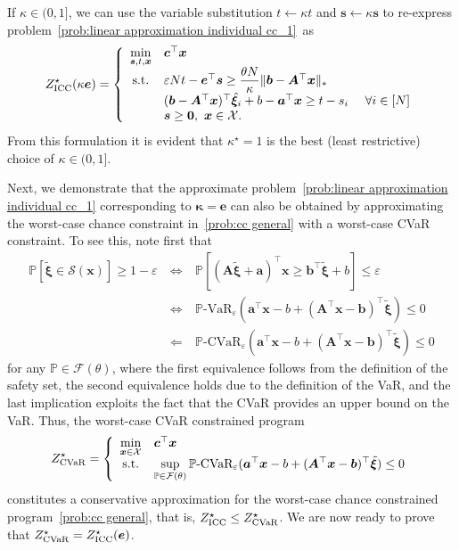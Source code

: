 \documentclass[nonblindrev]{informs2017}
\newcommand{\bmt}[1]{\tilde{\bm{#1}}}
\newcommand{\bmh}[1]{\hat{\bm{#1}}}
\newcommand{\1}[1]{\mathds{1}{\left(#1\right)}}
\begin{document}
If $\kappa\in (0,1]$, we can use the variable substitution $t\leftarrow \kappa t$ and $\bm{s} \leftarrow \kappa \bm{s}$ to re-express problem~\eqref{prob:linear approximation individual cc_1}~as
\[
Z^\star_{\rm ICC}(\kappa\bm{e}) =\left\{\begin{array}{cll}
\displaystyle \min_{\bm{s},t,\bm{x}} & \bm{c}^\top\bm{x} \\
{\rm s.t.} & \varepsilon N t - \bm{e}^\top\bm{s} \geq \dfrac{\theta N}{\kappa} \|\bm{b} - \bm{A}^\top\bm{x}\|_* \\
& (\bm{b} - \bm{A}^\top\bm{x})^\top\bmh{\xi}_i +b- \bm{a}^\top\bm{x} \geq t - s_i &~\forall i \in [N] \\
& \bm{s} \geq \bm{0}, ~\bm{x} \in \mathcal{X}.
\end{array}\right.
\]
From this formulation it is evident that $\kappa^\star = 1$ is the best (least restrictive) choice of $\kappa \in (0,1]$. 
\hfill \Halmos
\endproof

Next, we demonstrate that the approximate problem~\eqref{prob:linear approximation individual cc_1} corresponding to $\bm \kappa=\bm e$ can also be obtained by approximating the worst-case chance constraint in~\eqref{prob:cc general} with a worst-case CVaR constraint. To see this, note first that 
\begin{eqnarray*}
	\mathbb{P}[\bmt{\xi} \in \mathcal{S}(\bm{x})] \ge 1-\varepsilon ~& \iff &~ \mathbb{P}[(\bm{A}\bmt{\xi} + \bm{a})^\top \bm{x} \ge \bm{b}^\top\bmt{\xi} + b]\le\varepsilon \\
	~&\iff &~ \mathbb{P}\text{-VaR}_{\varepsilon}(\bm{a}^\top\bm{x} - b+ (\bm{A}^\top\bm{x}-\bm{b})^\top\bmt{\xi}) \leq 0 \\
	~&\Longleftarrow &~ \mathbb{P}\text{-CVaR}_{\varepsilon}(\bm{a}^\top\bm{x} - b+ (\bm{A}^\top\bm{x}-\bm{b})^\top\bmt{\xi}) \leq 0
\end{eqnarray*}
for any $\mathbb P\in  \mathcal{F}(\theta)$, where the first equivalence follows from the definition of the safety set, the second equivalence holds due to the definition of the VaR, and the last implication exploits the fact that the CVaR provides an upper bound on the VaR. Thus, the worst-case CVaR constrained program
\begin{equation}
\label{eq:wc-cvar-program}
Z^\star_{\rm CVaR}=\left\{ \begin{array}{cl}
\displaystyle \min_{\bm{x} \in \mathcal{X}} & \bm{c}^\top\bm{x} \\
{\rm s.t.} & \displaystyle \sup_{\mathbb{P} \in \mathcal{F}(\theta)} \mathbb{P}\text{-CVaR}_{\varepsilon}(\bm{a}^\top\bm{x} - b+ (\bm{A}^\top\bm{x}-\bm{b})^\top\bmt{\xi}) \leq 0
\end{array}\right.
\end{equation}
constitutes a conservative approximation for the worst-case chance constrained program~\eqref{prob:cc general}, that is, $Z^\star_{\rm ICC} \le Z^\star_{\rm CVaR}$. We are now ready to prove that $Z^\star_{\rm CVaR}= Z^\star_{\rm ICC}(\bm e)$.
\end{document}
